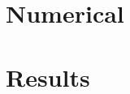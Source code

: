 \documentclass{article}
\begin{document}
    \chapter{Numerical}
        
    \newpage
    \chapter{Results}

    \appendix
    \begin{appendices}
        \newpage
        
        \newpage
        
    \end{appendices}
        
    \newpage
    
    
\end{document}
